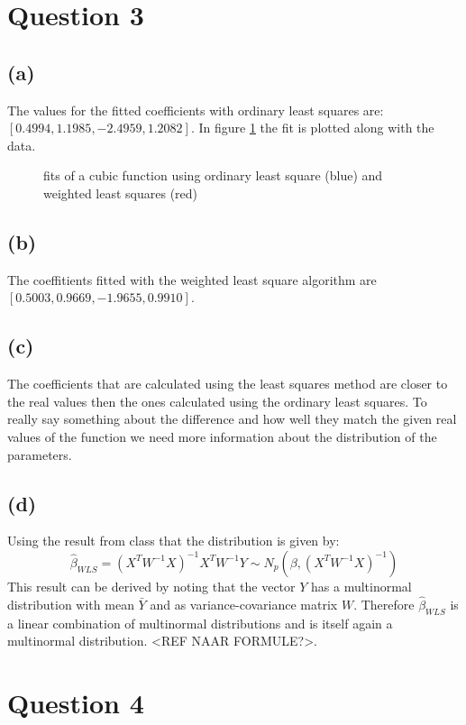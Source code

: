 \documentclass[a4paper]{article}
\begin{document}
\section*{Question 3}

\subsection*{(a)}
The values for the fitted coefficients with ordinary least squares are: $[0.4994, 1.1985, -2.4959, 1.2082]$. In figure \ref{fig:fit-3} the fit is plotted along with the data. 
\begin{figure}
	\centering
	
	\caption{fits of a cubic function using ordinary least square (blue) and weighted least squares (red)}
	\label{fig:fit-3}
\end{figure}

\subsection*{(b)}
The coeffitients fitted with the weighted least square algorithm are $[0.5003, 0.9669, -1.9655, 0.9910]$.

\subsection*{(c)}
The coefficients that are calculated using the least squares method are closer to the real values then the ones calculated using the ordinary least squares. To really say something about the difference and how well they match the given real values of the function we need more information about the distribution of the parameters.

\subsection*{(d)}
Using the result from class that the distribution is given by:
\begin{equation*}
	\hat{\beta}_{WLS} = (X^TW^{-1}X)^{-1} X^T W^{-1}Y \sim N_p(\beta, (X^TW^{-1}X)^{-1})
\end{equation*}
This result can be derived by noting that the vector $Y$ has a multinormal distribution with mean $\bar{Y}$ and as variance-covariance matrix $W$. Therefore $\hat{\beta}_{WLS}$ is a linear combination of multinormal distributions and is itself again a multinormal distribution. <REF NAAR FORMULE?>.


\section*{Question 4}
\end{document}

